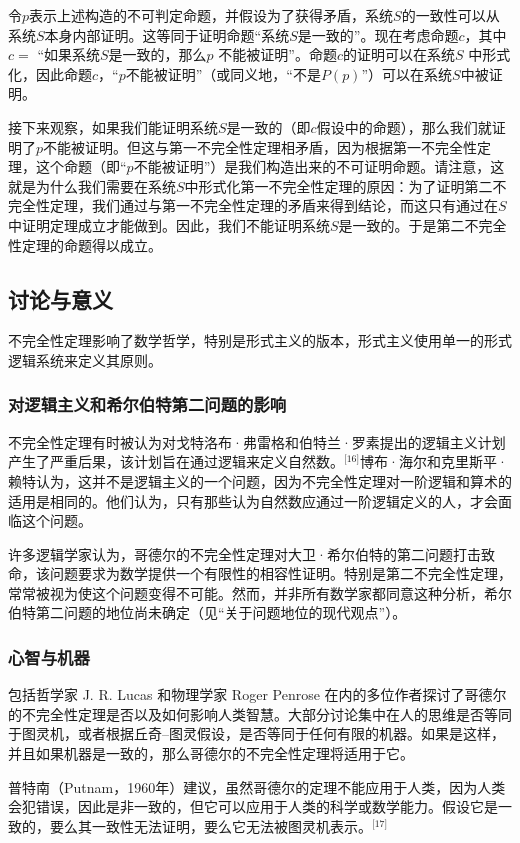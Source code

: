 令\( p \)表示上述构造的不可判定命题，并假设为了获得矛盾，系统\( S \)的一致性可以从系统\( S \)本身内部证明。这等同于证明命题“系统\( S \)是一致的”。现在考虑命题\( c \)，其中 \( c = \) “如果系统\( S \)是一致的，那么\( p \) 不能被证明”。命题\( c \)的证明可以在系统\( S \) 中形式化，因此命题\( c \)，“\( p \)不能被证明”（或同义地，“不是\( P(p) \)”）可以在系统\( S \)中被证明。

接下来观察，如果我们能证明系统\( S \)是一致的（即\( c \)假设中的命题），那么我们就证明了\( p \)不能被证明。但这与第一不完全性定理相矛盾，因为根据第一不完全性定理，这个命题（即“\( p \)不能被证明”）是我们构造出来的不可证明命题。请注意，这就是为什么我们需要在系统\( S \)中形式化第一不完全性定理的原因：为了证明第二不完全性定理，我们通过与第一不完全性定理的矛盾来得到结论，而这只有通过在\( S \)中证明定理成立才能做到。因此，我们不能证明系统\( S \)是一致的。于是第二不完全性定理的命题得以成立。
\subsection{讨论与意义} 
不完全性定理影响了数学哲学，特别是形式主义的版本，形式主义使用单一的形式逻辑系统来定义其原则。
\subsubsection{对逻辑主义和希尔伯特第二问题的影响}  
不完全性定理有时被认为对戈特洛布·弗雷格和伯特兰·罗素提出的逻辑主义计划产生了严重后果，该计划旨在通过逻辑来定义自然数。\(^\text{[16]}\)博布·海尔和克里斯平·赖特认为，这并不是逻辑主义的一个问题，因为不完全性定理对一阶逻辑和算术的适用是相同的。他们认为，只有那些认为自然数应通过一阶逻辑定义的人，才会面临这个问题。

许多逻辑学家认为，哥德尔的不完全性定理对大卫·希尔伯特的第二问题打击致命，该问题要求为数学提供一个有限性的相容性证明。特别是第二不完全性定理，常常被视为使这个问题变得不可能。然而，并非所有数学家都同意这种分析，希尔伯特第二问题的地位尚未确定（见“关于问题地位的现代观点”）。
\subsubsection{心智与机器}  
包括哲学家 J. R. Lucas 和物理学家 Roger Penrose 在内的多位作者探讨了哥德尔的不完全性定理是否以及如何影响人类智慧。大部分讨论集中在人的思维是否等同于图灵机，或者根据丘奇–图灵假设，是否等同于任何有限的机器。如果是这样，并且如果机器是一致的，那么哥德尔的不完全性定理将适用于它。

普特南（Putnam，1960年）建议，虽然哥德尔的定理不能应用于人类，因为人类会犯错误，因此是非一致的，但它可以应用于人类的科学或数学能力。假设它是一致的，要么其一致性无法证明，要么它无法被图灵机表示。\(^\text{[17]}\)

